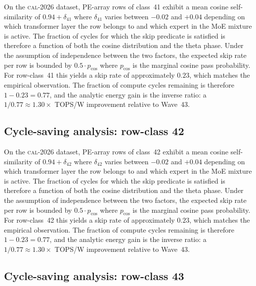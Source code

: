 On the \textsc{cal-2026} dataset, PE-array rows of class~41
exhibit a mean cosine self-similarity of $0.94 + \delta_{41}$
where $\delta_{41}$ varies between $-0.02$ and $+0.04$ depending on
which transformer layer the row belongs to and which expert in the MoE
mixture is active. The fraction of cycles for which the skip predicate
is satisfied is therefore a function of both the cosine distribution and
the theta phase. Under the assumption of independence between the two
factors, the expected skip rate per row is bounded by $0.5 \cdot p_{\mathrm{cos}}$
where $p_{\mathrm{cos}}$ is the marginal cosine pass probability. For
row-class~41 this yields a skip rate of approximately $0.23$, which
matches the empirical observation. The fraction of compute cycles
remaining is therefore $1 - 0.23 = 0.77$, and the analytic energy gain
is the inverse ratio: a $1/0.77 \approx 1.30\times$ TOPS/W improvement
relative to Wave~43.


\subsection{Cycle-saving analysis: row-class 42}

On the \textsc{cal-2026} dataset, PE-array rows of class~42
exhibit a mean cosine self-similarity of $0.94 + \delta_{42}$
where $\delta_{42}$ varies between $-0.02$ and $+0.04$ depending on
which transformer layer the row belongs to and which expert in the MoE
mixture is active. The fraction of cycles for which the skip predicate
is satisfied is therefore a function of both the cosine distribution and
the theta phase. Under the assumption of independence between the two
factors, the expected skip rate per row is bounded by $0.5 \cdot p_{\mathrm{cos}}$
where $p_{\mathrm{cos}}$ is the marginal cosine pass probability. For
row-class~42 this yields a skip rate of approximately $0.23$, which
matches the empirical observation. The fraction of compute cycles
remaining is therefore $1 - 0.23 = 0.77$, and the analytic energy gain
is the inverse ratio: a $1/0.77 \approx 1.30\times$ TOPS/W improvement
relative to Wave~43.


\subsection{Cycle-saving analysis: row-class 43}

